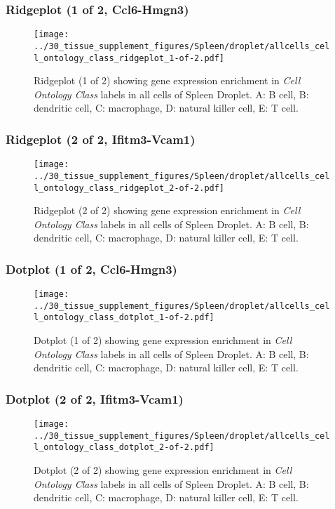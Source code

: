 \subsubsection{Ridgeplot (1 of 2, Ccl6-Hmgn3)}
\begin{figure}[h]
\centering
\texttt{[image: ../30\_tissue\_supplement\_figures/Spleen/droplet/allcells\_cell\_ontology\_class\_ridgeplot\_1-of-2.pdf]}

\caption{ Ridgeplot (1 of 2)  showing gene expression enrichment in \emph{Cell Ontology Class} labels in all cells of Spleen Droplet. A: B cell, B: dendritic cell, C: macrophage, D: natural killer cell, E: T cell.}
\end{figure}


\clearpage

\subsubsection{Ridgeplot (2 of 2, Ifitm3-Vcam1)}
\begin{figure}[h]
\centering
\texttt{[image: ../30\_tissue\_supplement\_figures/Spleen/droplet/allcells\_cell\_ontology\_class\_ridgeplot\_2-of-2.pdf]}

\caption{ Ridgeplot (2 of 2)  showing gene expression enrichment in \emph{Cell Ontology Class} labels in all cells of Spleen Droplet. A: B cell, B: dendritic cell, C: macrophage, D: natural killer cell, E: T cell.}
\end{figure}


\clearpage

\subsubsection{Dotplot (1 of 2, Ccl6-Hmgn3)}
\begin{figure}[h]
\centering
\texttt{[image: ../30\_tissue\_supplement\_figures/Spleen/droplet/allcells\_cell\_ontology\_class\_dotplot\_1-of-2.pdf]}

\caption{ Dotplot (1 of 2)  showing gene expression enrichment in \emph{Cell Ontology Class} labels in all cells of Spleen Droplet. A: B cell, B: dendritic cell, C: macrophage, D: natural killer cell, E: T cell.}
\end{figure}


\clearpage

\subsubsection{Dotplot (2 of 2, Ifitm3-Vcam1)}
\begin{figure}[h]
\centering
\texttt{[image: ../30\_tissue\_supplement\_figures/Spleen/droplet/allcells\_cell\_ontology\_class\_dotplot\_2-of-2.pdf]}

\caption{ Dotplot (2 of 2)  showing gene expression enrichment in \emph{Cell Ontology Class} labels in all cells of Spleen Droplet. A: B cell, B: dendritic cell, C: macrophage, D: natural killer cell, E: T cell.}
\end{figure}


